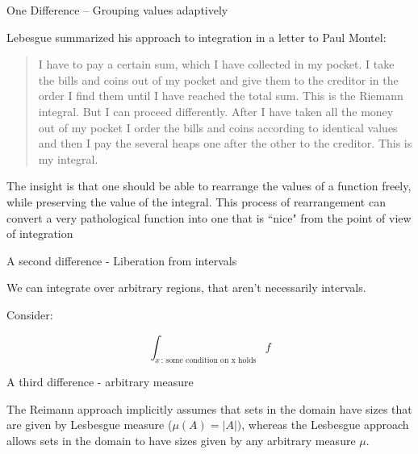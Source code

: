 \documentclass[10pt]{beamer}
\begin{document}
\begin{frame}{One Difference -- Grouping values adaptively}
	

Lebesgue summarized his approach to integration in a letter to Paul Montel:
\begin{quotation}
I have to pay a certain sum, which I have collected in my pocket.  I take the bills and coins out of my pocket and give them to the creditor in the order I find them until I have reached the total sum. This is the Riemann integral. But I can proceed differently. After I have taken all the money out of my pocket I order the bills and coins according to identical values and then I pay the several heaps one after the other to the creditor. This is my integral.
\end{quotation}



The insight is that one should be able to rearrange the values of a function freely, while preserving the value of the integral.  This process of rearrangement can convert a very pathological function into one that is ``nice" from the point of view of integration %
\end{frame}

\begin{frame}{A second difference - Liberation from intervals}

We can integrate over arbitrary regions, that aren't necessarily intervals.

Consider: 
 
\[  \int_{x \, : \, \text{some condition on x holds}} f  \]

\end{frame}

\begin{frame}{A third difference - arbitrary measure}
	
The Reimann approach implicitly assumes that sets in the domain have sizes that are given by Lesbesgue measure ($\mu(A) = |A|)$, whereas the Lesbesgue approach allows sets in the domain to have sizes given by any arbitrary measure $\mu$.
\end{frame}

%
%
\end{document}

